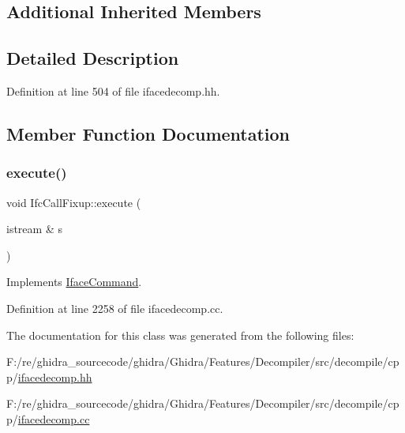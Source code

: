 \subsection*{Additional Inherited Members}


\subsection{Detailed Description}


Definition at line 504 of file ifacedecomp.\+hh.



\subsection{Member Function Documentation}
\mbox{\label{class_ifc_call_fixup_a303769cfca9f66c9409774fb823efd96}} 
\subsubsection{\texorpdfstring{execute()}{execute()}}
{\footnotesize\ttfamily void Ifc\+Call\+Fixup\+::execute (\begin{DoxyParamCaption}\item[{istream \&}]{s }\end{DoxyParamCaption})\hspace{0.3cm}{\ttfamily [virtual]}}



Implements \mbox{\hyperlink{class_iface_command_af10e29cee2c8e419de6efe9e680ad201}{Iface\+Command}}.



Definition at line 2258 of file ifacedecomp.\+cc.



The documentation for this class was generated from the following files\+:\begin{DoxyCompactItemize}
\item 
F\+:/re/ghidra\+\_\+sourcecode/ghidra/\+Ghidra/\+Features/\+Decompiler/src/decompile/cpp/\mbox{\hyperlink{ifacedecomp_8hh}{ifacedecomp.\+hh}}\item 
F\+:/re/ghidra\+\_\+sourcecode/ghidra/\+Ghidra/\+Features/\+Decompiler/src/decompile/cpp/\mbox{\hyperlink{ifacedecomp_8cc}{ifacedecomp.\+cc}}\end{DoxyCompactItemize}
